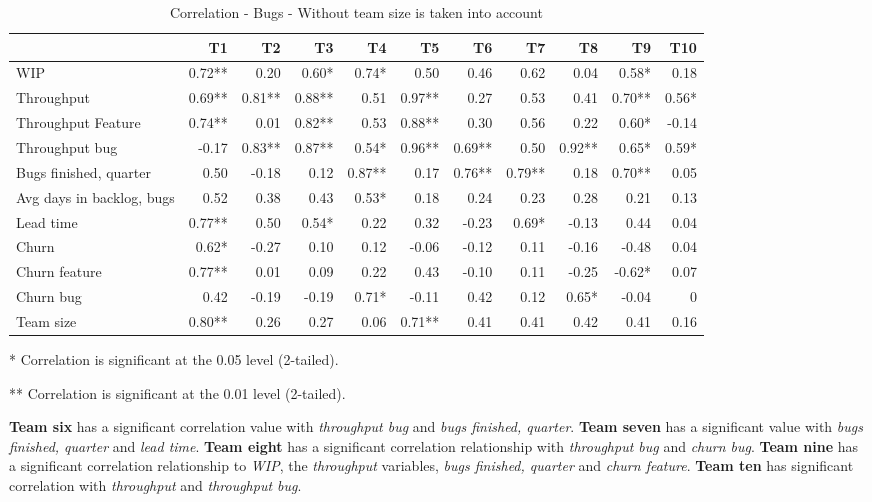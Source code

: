\documentclass[UKenglish]{ifimaster}  %
\begin{document}
\begin{table}[h]
 \begin{adjustwidth}{-2.5cm}{}
 \centering
 \begin{tabular}{|l|r|r|r|r|r|r|r|r|r|r|}
\hline
 &  \bf{T1} & \bf{T2} & \bf{T3} & \bf{T4} & \bf{T5} & \bf{T6} & \bf{T7} & \bf{T8} & \bf{T9} & \bf{T10}\\ \hline
 WIP  & 0.72** & 0.20 & 0.60* & 0.74* & 0.50 & 0.46 & 0.62 & 0.04 & 0.58* & 0.18 \\ \hline
 Throughput  & 0.69** & 0.81** & 0.88** & 0.51 & 0.97** & 0.27 & 0.53 & 0.41 & 0.70** & 0.56* \\ \hline
 Throughput Feature  & 0.74** & 0.01 & 0.82** & 0.53 & 0.88** & 0.30 & 0.56 & 0.22 & 0.60* & -0.14 \\ \hline
 Throughput bug  & -0.17 & 0.83** & 0.87** & 0.54* & 0.96** & 0.69** & 0.50 & 0.92** & 0.65* & 0.59* \\ \hline
 Bugs finished, quarter  & 0.50 & -0.18 & 0.12 & 0.87** & 0.17 & 0.76** & 0.79** & 0.18 & 0.70** & 0.05 \\ \hline
 Avg days in backlog, bugs  & 0.52 & 0.38 & 0.43 & 0.53* & 0.18 & 0.24 & 0.23 & 0.28 & 0.21 & 0.13 \\ \hline
 Lead time  & 0.77** & 0.50 & 0.54* & 0.22 & 0.32 & -0.23 & 0.69* & -0.13 & 0.44 & 0.04 \\ \hline
 Churn  & 0.62* & -0.27 & 0.10 & 0.12 & -0.06 & -0.12 & 0.11 & -0.16 & -0.48 & 0.04 \\ \hline
 Churn feature  & 0.77** & 0.01 & 0.09 & 0.22 & 0.43 & -0.10 & 0.11 & -0.25 & -0.62* & 0.07 \\ \hline
 Churn bug  & 0.42 & -0.19 & -0.19 & 0.71* & -0.11 & 0.42 & 0.12 & 0.65* & -0.04 & 0\\ \hline
 Team size  & 0.80** & 0.26 & 0.27 & 0.06 & 0.71** & 0.41 & 0.41 & 0.42 & 0.41 & 0.16 \\ \hline
\end{tabular}
 \caption{Correlation - Bugs - Without team size is taken into account}
 \label{corr:bug}
 \centerline {* Correlation is significant at the 0.05 level (2-tailed).}
\centerline{** Correlation is significant at the 0.01 level (2-tailed).}
\end{adjustwidth}
\end{table}
\newpage
\textbf{Team six} has a significant correlation value with \textit{throughput bug} and \textit{bugs finished, quarter}. \textbf{Team seven} has a significant value with \textit{bugs finished, quarter} and \textit{lead time}. \textbf{Team eight} has a significant correlation relationship with \textit{throughput bug} and \textit{churn bug}. \textbf{Team nine} has a significant correlation relationship to \textit{WIP}, the \textit{throughput} variables, \textit{bugs finished, quarter} and \textit{churn feature}. \textbf{Team ten} has significant correlation with \textit{throughput} and \textit{throughput bug}.
\end{document}
